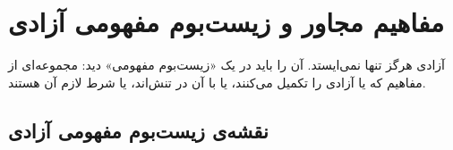 \section{مفاهیم مجاور و زیست‌بوم مفهومی آزادی}
\label{sec:concepts}

آزادی هرگز تنها نمی‌ایستد. آن را باید در یک «زیست‌بوم مفهومی» دید: مجموعه‌ای از مفاهیم که یا آزادی را تکمیل می‌کنند، یا با آن در تنش‌اند، یا شرط لازم آن هستند.

\subsection{نقشه‌ی زیست‌بوم مفهومی آزادی}
\label{subsec:ecosystem}

